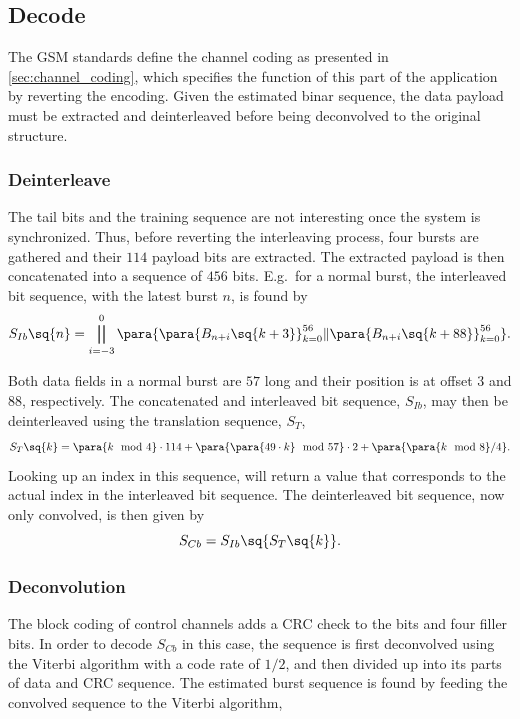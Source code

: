 \subsection{Decode}
The \gls{GSM} standards define the channel coding as presented in
\cref{sec:channel_coding}, which specifies the function of this part
of the application by reverting the encoding. Given the estimated
binar sequence, the data payload must be extracted and deinterleaved
before being deconvolved to the original structure.

\subsubsection{Deinterleave}
The tail bits and the training sequence are not interesting once the
system is synchronized. Thus, before reverting the interleaving
process, four bursts are gathered and their $114$ payload bits are
extracted. The extracted payload is then concatenated into a sequence
of $456$ bits. E.g.\ for a normal burst, the interleaved bit sequence,
with the latest burst $n$, is found by
\begin{equation}
  S_{Ib} \sq{n} = \bigparallel_{i = -3}^0 \para{
        \para{B_{n + i}\sq{k + 3}}^{56}_{k=0} \Vert
        \para{B_{n + i}\sq{k + 88}}^{56}_{k=0}}.
\end{equation}

Both data fields in a normal burst are $57$ long and their position is
at offset $3$ and $88$, respectively. The concatenated and interleaved
bit sequence, $S_{Ib}$, may then be deinterleaved using the
translation sequence, $S_T$,
\begin{equation}
  S_T\sq{k} = \para{k \mod 4} \cdot 114 + \para{\para{49 \cdot k}
      \mod 57} \cdot 2 + \para{\para{k \mod 8} / 4}.
\end{equation}
Looking up an index in this sequence, will return a value that
corresponds to the actual index in the interleaved bit sequence. The
deinterleaved bit sequence, now only convolved, is then given by
\begin{equation}
  S_{Cb} = S_{Ib} \sq{S_T \sq{k}}.
\end{equation}

\subsubsection{Deconvolution}
The block coding of control channels adds a \gls{CRC} check to the
bits and four filler bits. In order to decode $S_{Cb}$ in this case,
the sequence is first deconvolved using the Viterbi algorithm with a
code rate of $1/2$, and then divided up into its parts of data and
\gls{CRC} sequence. The estimated burst sequence is found by feeding
the convolved sequence to the Viterbi algorithm,

